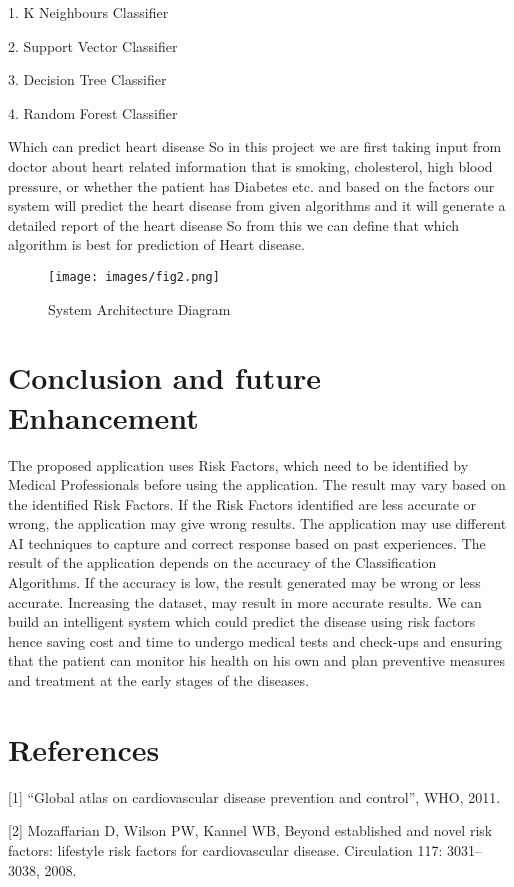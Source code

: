 \documentclass{article}
\begin{document}
1. K Neighbours Classifier

2. Support Vector Classifier 

3. Decision Tree Classifier 

4. Random Forest Classifier

Which can predict heart disease So in this project we are first taking input from doctor about heart related information that is smoking, cholesterol, high blood pressure, or whether the patient has Diabetes etc. and based on the factors our system will predict the heart disease from given algorithms and it will generate a detailed report of the heart disease So from this we can define that which algorithm is best for prediction of Heart disease.

\begin{figure}[H]
    \centering
    \texttt{[image: images/fig2.png]}
    \caption{System Architecture Diagram}
    \label{fig:my_label2}
\end{figure}

\section{Conclusion and future Enhancement}
The proposed application uses Risk Factors, which need to be identified by Medical Professionals before using the application. The result may vary based on the identified Risk Factors. If the Risk Factors identified are less accurate or wrong, the application may give wrong results. The application may use different AI techniques to capture and correct response based on past experiences. The result of the application depends on the accuracy of the Classification Algorithms. If the accuracy is low, the result generated may be wrong or less accurate. Increasing the dataset, may result in more accurate results. We can build an intelligent system which could predict the disease using risk factors hence saving cost and time to undergo medical tests and check-ups and ensuring that the patient can monitor his health on his own and plan preventive measures and treatment at the early stages of the diseases.

\section{References}

[1] “Global atlas on cardiovascular disease prevention and control”, WHO, 2011.

[2] Mozaffarian D, Wilson PW, Kannel WB, Beyond established and novel risk factors: lifestyle risk factors for cardiovascular disease. Circulation 117: 3031–3038, 2008.
\end{document}

